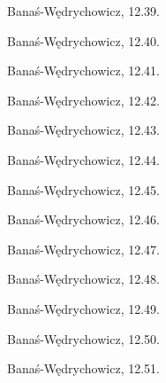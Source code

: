 \begin{problem}
    Banaś-Wędrychowicz, 12.39.
\end{problem}

\begin{problem}
    Banaś-Wędrychowicz, 12.40.
\end{problem}

\begin{problem}
    Banaś-Wędrychowicz, 12.41.
\end{problem}

\begin{problem}
    Banaś-Wędrychowicz, 12.42.
\end{problem}

\begin{problem}
    Banaś-Wędrychowicz, 12.43.
\end{problem}

\begin{problem}
    Banaś-Wędrychowicz, 12.44.
\end{problem}

\begin{problem}
    Banaś-Wędrychowicz, 12.45.
\end{problem}

\begin{problem}
    Banaś-Wędrychowicz, 12.46.
\end{problem}

\begin{problem}
    Banaś-Wędrychowicz, 12.47.
\end{problem}

\begin{problem}
    Banaś-Wędrychowicz, 12.48.
\end{problem}

\begin{problem}
    Banaś-Wędrychowicz, 12.49.
\end{problem}

\begin{problem}
    Banaś-Wędrychowicz, 12.50.
\end{problem}

\begin{problem}
    Banaś-Wędrychowicz, 12.51.
\end{problem}

